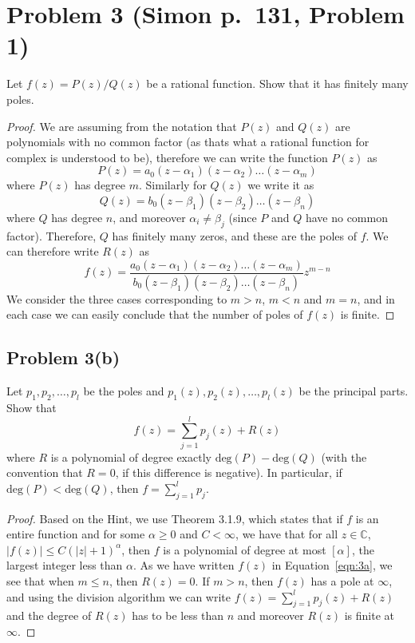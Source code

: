 \documentclass{article}[12pt]
\def\CC{{\mathbb C}}
\begin{document}
\section*{Problem 3 (Simon p.~131, Problem 1)}
Let $f(z)=P(z)/Q(z)$ be a rational function. Show that it has
finitely many poles.
\begin{proof}
We are assuming from the notation that $P(z)$ and $Q(z)$ are
polynomials with no common factor 
(as thats what a rational function for complex is
understood to be), therefore we can write the function $P(z)$
as
\[
P(z)=a_0(z-\alpha_1)(z-\alpha_2)\ldots(z-\alpha_m)
\]
where $P(z)$ has degree $m$. Similarly for $Q(z)$ we write it as
\[
Q(z)=b_0(z-\beta_1)(z-\beta_2)\ldots(z-\beta_n)
\]
where $Q$ has degree $n$, and moreover $\alpha_i\ne\beta_j$ (since
$P$ and $Q$ have no common factor).
Therefore, $Q$ has finitely many zeros, and these are the poles
of $f$. We can therefore write $R(z)$ as
\begin{equation}
f(z) = \frac{a_0(z-\alpha_1)(z-\alpha_2)\ldots(z-\alpha_m)}
{b_0(z-\beta_1)(z-\beta_2)\ldots(z-\beta_n)}z^{m-n} \label{eqn:3a}
\end{equation}
We consider the three cases corresponding to $m>n$, $m<n$ and $m=n$,
and in each case we can easily conclude that the number of poles
of $f(z)$ is finite.
\end{proof}

\subsection*{Problem 3(b)}
Let $p_1,p_2,\ldots,p_l$ be the poles and $p_1(z),p_2(z),\ldots,p_l(z)$
be the principal parts. Show that
\[
f(z) = \sum_{j=1}^l p_j(z) + R(z)
\]
where $R$ is a polynomial of degree exactly $\mbox{deg}(P)-\mbox{deg}(Q)$
(with the convention that $R=0$, if this difference is negative).
In particular, if $\mbox{deg}(P) < \mbox{deg}(Q)$, then 
$f=\sum_{j=1}^l p_j$.
\begin{proof}
Based on the Hint, we use Theorem 3.1.9, which states that
if $f$ is an entire function and for some $\alpha \ge 0$ and
$C<\infty$, we have that for all $z\in\CC$, $|f(z)| \le C(|z|+1)^\alpha$,
then $f$ is a polynomial of degree at most $[\alpha]$, the largest
integer less than $\alpha$.
As we have written $f(z)$ in Equation~\ref{eqn:3a}, we see that when
$m\le n$, then $R(z)=0$. If $m>n$, then $f(z)$ has a pole at $\infty$,
and using the division algorithm we can write $f(z)=\sum_{j=1}^l p_j(z)+R(z)$
and the degree of $R(z)$ has to be less than $n$ and moreover
$R(z)$ is finite at $\infty$.
\end{proof}
\end{document}
